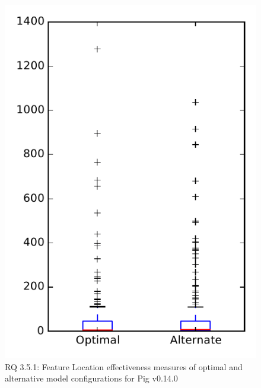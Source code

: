 
\begin{figure}
\centering
\includegraphics[height=0.4\textheight]{figures/combo/flt_rq1_pig}
\caption{RQ 3.5.1: Feature Location effectiveness measures of optimal and alternative model configurations for Pig v0.14.0}
\label{fig:combo:flt:rq1:pig}
\end{figure}
